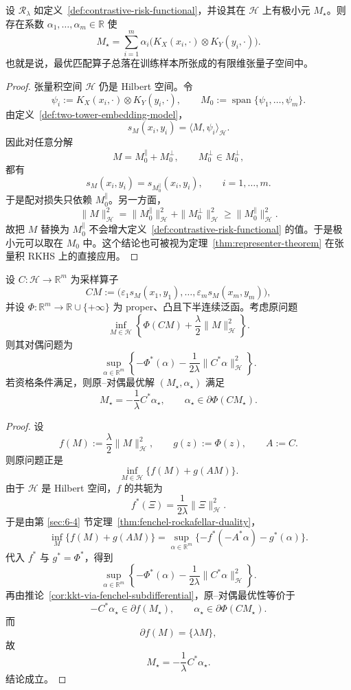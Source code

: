 \begin{proposition}[双塔模型的表示定理]\label{prop:two-tower-representer}
设 $\mathcal R_\lambda$ 如定义~\ref{def:contrastive-risk-functional}，并设其在 $\mathcal H$ 上有极小元 $M_\star$。则存在系数 $\alpha_1,\dots,\alpha_m\in \mathbb R$ 使
\[
M_\star
=
\sum_{i=1}^m \alpha_i
\bigl(K_X(x_i,\cdot)\otimes K_Y(y_i,\cdot)\bigr).
\]
也就是说，最优匹配算子总落在训练样本所张成的有限维张量子空间中。
\end{proposition}

\begin{proof}
张量积空间 $\mathcal H$ 仍是 Hilbert 空间。令
\[
\psi_i:=K_X(x_i,\cdot)\otimes K_Y(y_i,\cdot),
\qquad
M_0:=\operatorname{span}\{\psi_1,\dots,\psi_m\}.
\]
由定义~\ref{def:two-tower-embedding-model}，
\[
s_M(x_i,y_i)=\langle M,\psi_i\rangle_{\mathcal H}.
\]
因此对任意分解
\[
M=M_0^\parallel+M_0^\perp,
\qquad
M_0^\perp\in M_0^\perp,
\]
都有
\[
s_M(x_i,y_i)=s_{M_0^\parallel}(x_i,y_i),\qquad i=1,\dots,m.
\]
于是配对损失只依赖 $M_0^\parallel$。另一方面，
\[
\|M\|_{\mathcal H}^2
=
\|M_0^\parallel\|_{\mathcal H}^2+\|M_0^\perp\|_{\mathcal H}^2
\ge
\|M_0^\parallel\|_{\mathcal H}^2.
\]
故把 $M$ 替换为 $M_0^\parallel$ 不会增大定义~\ref{def:contrastive-risk-functional} 的值。于是极小元可以取在 $M_0$ 中。这个结论也可被视为定理~\ref{thm:representer-theorem} 在张量积 RKHS 上的直接应用。
\end{proof}

\begin{theorem}[正则化匹配模型的对偶表示]\label{thm:embedding-duality-regularized}
设 $C\colon \mathcal H\to \mathbb R^m$ 为采样算子
\[
CM:=\bigl(\varepsilon_1 s_M(x_1,y_1),\dots,\varepsilon_m s_M(x_m,y_m)\bigr),
\]
并设 $\Phi\colon \mathbb R^m\to \mathbb R\cup\{+\infty\}$ 为 proper、凸且下半连续泛函。考虑原问题
\[
\inf_{M\in \mathcal H}
\left\{
\Phi(CM)+\frac{\lambda}{2}\|M\|_{\mathcal H}^2
\right\}.
\]
则其对偶问题为
\[
\sup_{\alpha\in \mathbb R^m}
\left\{
-\Phi^\ast(\alpha)-\frac{1}{2\lambda}\|C^\ast \alpha\|_{\mathcal H}^2
\right\}.
\]
若资格条件满足，则原--对偶最优解 $(M_\star,\alpha_\star)$ 满足
\[
M_\star=-\frac{1}{\lambda}C^\ast\alpha_\star,
\qquad
\alpha_\star\in \partial \Phi(CM_\star).
\]
\end{theorem}

\begin{proof}
设
\[
f(M):=\frac{\lambda}{2}\|M\|_{\mathcal H}^2,
\qquad
g(z):=\Phi(z),
\qquad
A:=C.
\]
则原问题正是
\[
\inf_{M\in \mathcal H}\{f(M)+g(AM)\}.
\]
由于 $\mathcal H$ 是 Hilbert 空间，$f$ 的共轭为
\[
f^\ast(\Xi)=\frac{1}{2\lambda}\|\Xi\|_{\mathcal H}^2.
\]
于是由第 \ref{sec:6-4} 节定理~\ref{thm:fenchel-rockafellar-duality}，
\[
\inf_{M}\{f(M)+g(AM)\}
=
\sup_{\alpha\in\mathbb R^m}
\{-f^\ast(-A^\ast \alpha)-g^\ast(\alpha)\}.
\]
代入 $f^\ast$ 与 $g^\ast=\Phi^\ast$，得到
\[
\sup_{\alpha\in \mathbb R^m}
\left\{
-\Phi^\ast(\alpha)-\frac{1}{2\lambda}\|C^\ast\alpha\|_{\mathcal H}^2
\right\}.
\]
再由推论~\ref{cor:kkt-via-fenchel-subdifferential}，原--对偶最优性等价于
\[
-C^\ast\alpha_\star\in \partial f(M_\star),
\qquad
\alpha_\star\in \partial \Phi(CM_\star).
\]
而
\[
\partial f(M)=\{\lambda M\},
\]
故
\[
M_\star=-\frac{1}{\lambda}C^\ast\alpha_\star.
\]
结论成立。
\end{proof}

